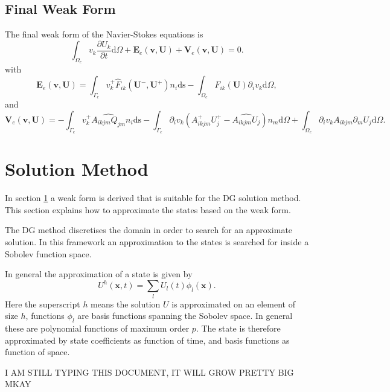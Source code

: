 \documentclass{report}
\newcommand{\dt}[1]{\frac{\partial #1}{\partial t}}
\begin{document}
\subsection{Final Weak Form}
The final weak form of the Navier-Stokes equations is
\begin{equation}
\label{e:weakformFinal}
\int_{\Omega_e} v_k \dt{U_k} \mathrm{d}\Omega
+ \mathbf{E}_e(\mathbf{v},\mathbf{U})
+ \mathbf{V}_e(\mathbf{v},\mathbf{U}) = 0.
\end{equation}
with
\begin{equation}
\mathbf{E}_e(\mathbf{v},\mathbf{U}) = 
\int_{\Gamma_e} v_k^{+} \hat{F}_{ik}(\mathbf{U}^{-},\mathbf{U}^{+}) n_i \mathrm{ds}
- \int_{\Omega_e} {F}_{ik}(\mathbf{U}) \partial_i v_k \mathrm{d}\Omega,
\end{equation}
and
\begin{equation}
\mathbf{V}_e(\mathbf{v},\mathbf{U}) = 
- \int_{\Gamma_e} v_k^{+} \widehat{{{A}_{ikjm} Q_{jm}}} n_i \mathrm{ds}
- \int_{\Gamma_e} \partial_i v_k (A_{ikjm}^+ U_j^{+} - \widehat{A_{ikjm} U_j})n_m \mathrm{d}\Omega
+ \int_{\Omega_e} \partial_i v_k A_{ikjm} \partial_m U_j \mathrm{d}\Omega.
\end{equation}

\section{Solution Method}
In section \ref{} a weak form is derived that is suitable for the DG solution method. This section explains how to approximate the states based on the weak form. 

The DG method discretises the domain in order to search for an approximate solution. In this framework an approximation to the states is searched for inside a Sobolev function space. %

In general the approximation of a state is given by
\begin{equation}
U^h(\mathbf{x},t) = \sum_l U_l(t) \phi_l(\mathbf{x}).
\end{equation}
Here the superscript $h$ means the solution $U$ is approximated on an element of size $h$, functions $\phi_l$ are basis functions spanning the Sobolev space. In general these are polynomial functions of maximum order $p$. The state is therefore approximated by state coefficients as function of time, and basis functions as function of space. 

I AM STILL TYPING THIS DOCUMENT, IT WILL GROW PRETTY BIG MKAY
\end{document}
